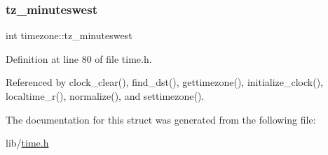 \subsubsection{\texorpdfstring{tz\+\_\+minuteswest}{tz\_minuteswest}}
{\footnotesize\ttfamily int timezone\+::tz\+\_\+minuteswest}



Definition at line 80 of file time.\+h.



Referenced by clock\+\_\+clear(), find\+\_\+dst(), gettimezone(), initialize\+\_\+clock(), localtime\+\_\+r(), normalize(), and settimezone().



The documentation for this struct was generated from the following file\+:\begin{DoxyCompactItemize}
\item 
lib/\hyperlink{time_8h}{time.\+h}\end{DoxyCompactItemize}
